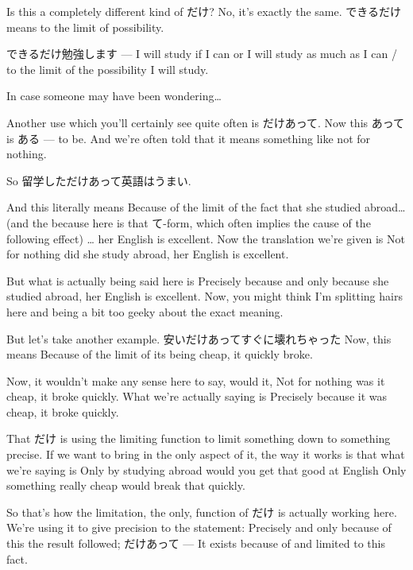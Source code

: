 Is this a completely different kind of だけ? No, it's exactly the same. できるだけ means to the limit of possibility.

できるだけ勉強します --- I will study if I can or I will study as much as I can / to the limit of the possibility I will study.

{}

In case someone may have been wondering\ldots{}

Another use which you'll certainly see quite often is だけあって. Now this あって is ある --- to be. And we're often told that it means something like not for nothing.

So 留学しただけあって英語はうまい.

{}

And this literally means Because of the limit of the fact that she studied abroad\ldots{} (and the because here is that て-form, which often implies the cause of the following effect) \ldots{} her English is excellent. Now the translation we're given is Not for nothing did she study abroad, her English is excellent.

But what is actually being said here is Precisely because and only because she studied abroad, her English is excellent. Now, you might think I'm splitting hairs here and being a bit too geeky about the exact meaning.

But let's take another example. 安いだけあってすぐに壊れちゃった Now, this means Because of the limit of its being cheap, it quickly broke.

Now, it wouldn't make any sense here to say, would it, Not for nothing was it cheap, it broke quickly. What we're actually saying is Precisely because it was cheap, it broke quickly.

{}

That だけ is using the limiting function to limit something down to something precise. If we want to bring in the only aspect of it, the way it works is that what we're saying is Only by studying abroad would you get that good at English Only something really cheap would break that quickly.

So that's how the limitation, the only, function of だけ is actually working here. We're using it to give precision to the statement: Precisely and only because of this the result followed; だけあって --- It exists because of and limited to this fact.

